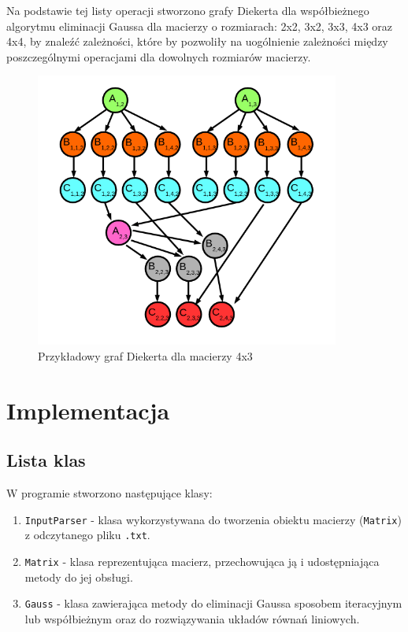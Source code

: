 \documentclass{article}
\begin{document}
Na podstawie tej listy operacji stworzono grafy Diekerta dla współbieżnego algorytmu eliminacji Gaussa dla macierzy o rozmiarach: 2x2, 3x2, 3x3, 4x3 oraz 4x4, by znaleźć zależności, które by pozwoliły na uogólnienie zależności między poszczególnymi operacjami dla dowolnych rozmiarów macierzy.


\begin{figure}[htb]
\centering
\includegraphics[width=10cm]{graf.png}
\caption{Przykładowy graf Diekerta dla macierzy 4x3}
\end{figure}


\section{Implementacja}

\subsection{Lista klas}

W programie stworzono następujące klasy:

\begin{enumerate}
    \item \texttt{InputParser} - klasa wykorzystywana do tworzenia obiektu macierzy (\texttt{Matrix}) z odczytanego pliku \texttt{.txt}.
    \item \texttt{Matrix} - klasa reprezentująca macierz, przechowująca ją i udostępniająca metody do jej obsługi.
    \item \texttt{Gauss} - klasa zawierająca metody do eliminacji Gaussa sposobem iteracyjnym lub współbieżnym oraz do rozwiązywania układów równań liniowych.
\end{enumerate}
\end{document}
